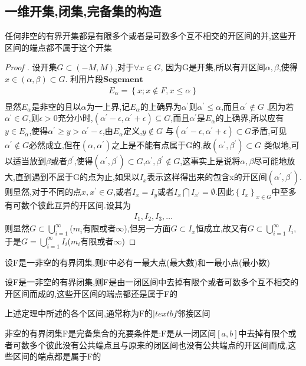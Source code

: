 \subsection{一维开集,闭集,完备集的构造}
\begin{Theorem}
    任何非空的有界开集都是有限多个或者是可数多个互不相交的开区间的并,这些开区间的端点都不属于这个开集
\end{Theorem}
\begin{proof}[Proof ]
    设开集\(G \subset (-M,M)\),对于\(\forall x \in G\), 因为G是开集,所以有开区间\(\alpha ,\beta \),使得\(x \in (\alpha ,\beta ) \subset G\).
    利用片段\(\textbf{Segement}\)
    \begin{align}
        E_{\alpha }= \left\{x ; x\notin F , x \leq \alpha \right\} \\ 
    \end{align}
    显然\(E_{\alpha }\)是非空的且以\(\alpha \)为一上界,记\(E_{\alpha }\)的上确界为\(\alpha^{'}\)则\(\alpha^{'} \leq \alpha \),而且\(\alpha^{'} \notin G\) ,因为若\(\alpha^{‘} \in G\),则\(\epsilon > 0 \)充分小时,\((\alpha^{'} - \epsilon ,\alpha^{'} +\epsilon) \subseteq G\),而且\(\alpha^{'}\)是\(E_{\alpha}\)的上确界,所以应有\(y \in E_{\alpha}\),使得\(\alpha^{'} \geq y> \alpha^{'} -\epsilon \),由\(E_{\alpha}\)定义,\(y\notin G\)
    与\((\alpha^{'}-\epsilon ,\alpha^{'}+\epsilon ) \subset G\)矛盾,可见\(\alpha^{'} \notin G\)必然成立,但在\((\alpha ,\alpha^{'})\)之上是不能有点属于G的,故\((\alpha^{'},\beta^{'}) \subset G\)
    类似地,可以适当放到\(\beta\)或者\(\beta^{'}\),使得\((\alpha^{'},\beta^{'}) \subset G\),\(\alpha^{'},\beta^{'} \notin G\),这事实上是说将\(\alpha,\beta\)尽可能地放大,直到遇到不属于G的点为止,如果以\(I_{x}\)表示这样得出来的包含x的开区间\((\alpha^{'},\beta^{'})\).则显然,对于不同的点\(x,x^{'} \in G\),或者\(I_x = I_y\)或者\(I_{x} \bigcap I_{x^{'}} = \emptyset\).因此\(\left\{I_{x}\right\}_{x\in G}\)中至多有可数个彼此互异的开区间.设其为
    \begin{align*}
        I_1 ,I_2,I_3,\dots
    \end{align*}
    则显然\(G \subset \bigcup\limits_{i=1}^{\infty}\)(\(m_i\)有限或者\(\infty\)),但另一方面\(G \subset I_{x}\)恒成立,故又有\(G \subset \bigcup\limits_{i=1}^{\infty} I_i\),于是\(G =\bigcup\limits_{i=1}^{\infty} I_i\)(\(m_i\)有限或者\(\infty\))
\end{proof}
\begin{Theorem}
    设F是一非空的有界闭集,则F中必有一最大点(最大数)和一最小点(最小数)
\end{Theorem}
\begin{Theorem}
    设F是一非空的有界闭集,则F是由一闭区间中去掉有限个或者可数多个互不相交的开区间而成的,这些开区间的端点都还是属于F的
\end{Theorem}
上述定理中所述的各个区间,通常称为F的\(|textbf{邻接区间}\)
\begin{Theorem}
    非空的有界闭集F是完备集合的充要条件是:F是从一闭区间\([a,b]\)中去掉有限个或者可数多个彼此没有公共端点且与原来的闭区间也没有公共端点的开区间而成,这些区间的端点都是属于F的
\end{Theorem}
